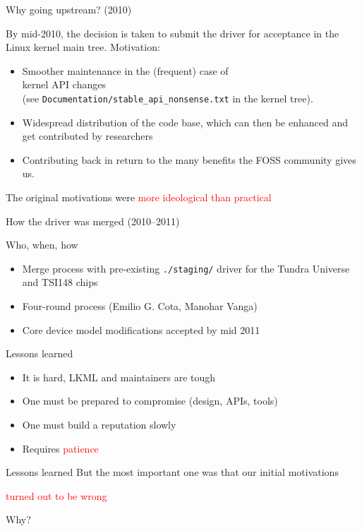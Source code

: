 \documentclass[compress,red]{beamer}
\begin{document}
\begin{frame}{Why going upstream? (2010)}

By mid-2010, the decision is taken to submit the driver for acceptance
in the Linux kernel main tree. Motivation:

\begin{itemize}
\item Smoother maintenance in the (frequent) case of\\
	kernel API changes\\
  (see \texttt{Documentation/stable\_api\_nonsense.txt} in the kernel
  tree).
\item Widespread distribution of the code base, which can then be
    enhanced and get contributed by researchers
\item Contributing back in return to the many benefits the FOSS community
    gives us.
\end{itemize}
The original motivations were \textcolor{red}{more ideological than
practical}
\end{frame}

\begin{frame}{How the driver was merged (2010--2011)}

\pause
\begin{block}{Who, when, how}
\begin{itemize}
\item Merge process with pre-existing \texttt{./staging/}
driver for the Tundra Universe and TSI148 chips
\item Four-round process (Emilio G. Cota, Manohar Vanga)
\item Core device model modifications accepted by mid 2011
\end{itemize}
\end{block}

\pause
\begin{block}{Lessons learned}
\begin{itemize}
\item It is hard, LKML and maintainers are tough
\item One must be prepared to compromise (design, APIs, tools)
\item One must build a reputation slowly
\item Requires \textcolor{red}{patience}
\end{itemize}
\end{block}
\end{frame}

\begin{frame}{Lessons learned}
But the most important one was that our initial motivations
\pause
\begin{center}
\textcolor{red}{turned out to be wrong}
\end{center}
\pause
\begin{center}
\Huge Why?
\end{center}
\end{frame}
\end{document}
